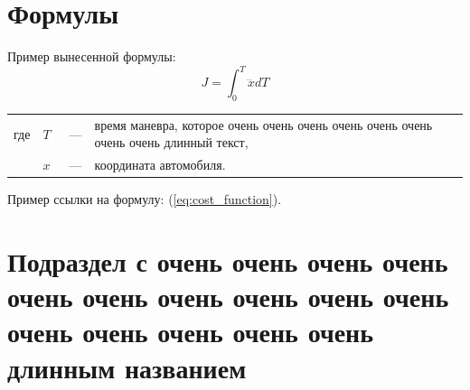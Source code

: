 \section{Формулы}
\aftertitle
Пример вынесенной формулы:
\begin{equation}
\label{eq:cost_function}
J = \int_{0}^{T}{\dddot{x}dT}
\end{equation}
\begin{tabulary}{\linewidth}{LLLL}
	где & $T$ &~---& время маневра, которое очень очень очень очень очень очень очень очень  длинный текст, \\
	& $x$ &~---& координата автомобиля.
\end{tabulary}

Пример ссылки на формулу:  (\ref{eq:cost_function}).

\section{Подраздел с очень очень очень очень очень очень очень очень очень очень очень очень очень очень очень длинным названием}

\StartAppendix



